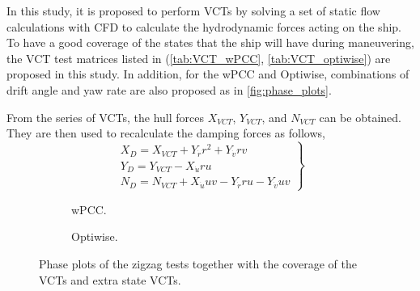 \noindent In this study, it is proposed to perform VCTs by solving a set of static flow calculations with CFD to calculate the hydrodynamic forces acting on the ship. To have a good coverage of the states that the ship will have during maneuvering, the VCT test matrices listed in (\autoref{tab:VCT_wPCC}, \autoref{tab:VCT_optiwise}) are proposed in this study. In addition, for the wPCC and Optiwise, combinations of drift angle and yaw rate are also proposed as in \autoref{fig:phase_plots}. 

From the series of VCTs, the hull forces $X_{VCT}$, $Y_{VCT}$, and $N_{VCT}$ can be obtained. They are then used to recalculate the damping forces as follows,
\begin{equation}
    \label{eq:X_D}
    \left.\begin{aligned}
    X_{D} = X_{VCT} + Y_{\dot{r}} r^{2} + Y_{\dot{v}} r v \\
    Y_{D} =  Y_{VCT} - X_{\dot{u}} r u\\
    N_{D} = N_{VCT} + X_{\dot{u}} u v - Y_{\dot{r}} r u - Y_{\dot{v}} u v
    \end{aligned}\right\}
\end{equation}


\begin{figure}[h]
     \centering
     \begin{subfigure}[b]{0.49\textwidth}
         \centering
         
        \caption{wPCC.}
        \label{fig:VCT_phase_plot_wPCC}
     \end{subfigure}
     \hfill
     \begin{subfigure}[b]{0.49\textwidth}
        \centering
        
        \caption{Optiwise.}
        \label{fig:VCT_phase_plot_optiwise}
     \end{subfigure}
        \caption{Phase plots of the zigzag tests together with the coverage of the VCTs and extra state VCTs.}
        \label{fig:phase_plots}
\end{figure}

